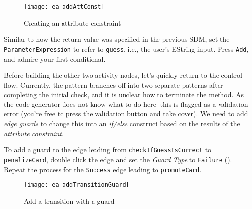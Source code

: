 \begin{stepbystep}
\vspace{0.5cm}

\begin{figure}[htbp]
\begin{center}
  \texttt{[image: ea\_addAttConst]}
  \caption{Creating an attribute constraint}
  \label{ea:sdmcheck_att_constraint}
\end{center}
\end{figure}

\item Similar to how the return value was specified in the previous SDM, set the \texttt{ParameterExpression} to refer to \texttt{guess},
i.e., the user's EString input. Press \texttt{Add}, and admire your first conditional.

\end{stepbystep}

Before building the other two activity nodes, let's quickly return to the control flow. Currently, the pattern branches off into two separate patterns after
completing the initial check, and it is unclear how to terminate the method. As the code generator does not know what to do here, this is flagged as a
validation error (you're free to press the validation button and take cover). We
need to add \emph{edge guards} to change this into an \emph{if/else} construct based on the results of the \emph{attribute constraint}.

\newpage
\begin{stepbystep}

\item To add a guard to the edge leading from \texttt{check\-If\-Guess\-Is\-Correct} to \texttt{penalize\-Card}, double click the edge
and set the \emph{Guard Type} to \texttt{Failure} ().
Repeat the process for the \texttt{Success} edge leading to \texttt{promoteCard}.

\vspace{0.5cm}

\begin{figure}[htbp]
\begin{center}
  \texttt{[image: ea\_addTransitionGuard]}
  \caption{Add a transition with a guard}
  \label{ea:sdm_check_guard}
\end{center}
\end{figure}

\vspace{0.5cm}

\end{stepbystep}

